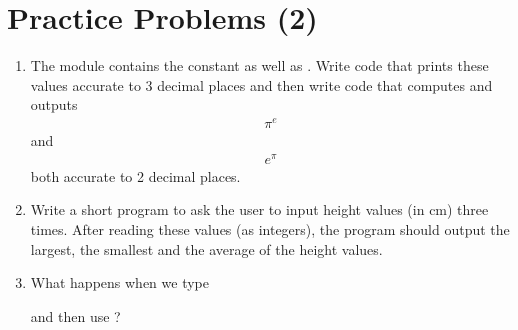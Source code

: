 \documentclass[letterpaper,10pt,english]{sphinxmanual}
\begin{document}
\section{Practice Problems (2)}
\label{\detokenize{lecture_notes/lec04_modules_functions1:practice-problems-2}}\begin{enumerate}
\item {} 
The  module contains the constant  as well as .
Write code that prints these values accurate to 3 decimal places
and then write code that computes and outputs
\begin{equation*}
\begin{split}\pi^e\end{split}
\end{equation*}
and
\begin{equation*}
\begin{split}e^\pi\end{split}
\end{equation*}
both accurate to 2 decimal places.

\item {} 
Write a short program to ask the user to input height
values (in cm) three times.  After reading these values (as
integers), the program should output the largest, the smallest and
the average of the height values.

\item {} 
What happens when we type

%
\begin{sphinxVerbatim}[commandchars=\\\{\}]
 
  
\end{sphinxVerbatim}

and then use ?

\end{enumerate}
\end{document}
